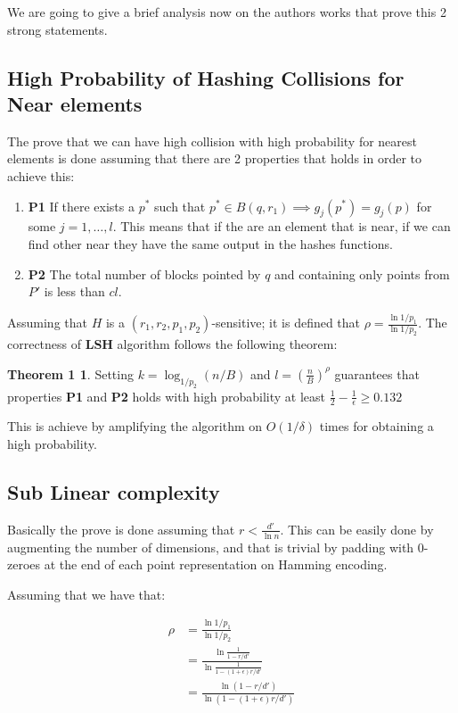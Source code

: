 \documentclass[12pt, a4paper]{article}
\theoremstyle{definition}
\begin{document}
We are going to give a brief analysis now on the authors works that prove this 2 strong statements.

\subsection{High Probability of Hashing Collisions for Near elements}
The prove that we can have high collision with high probability for nearest elements is done assuming that there are 2 properties that holds in order to achieve this:

\begin{enumerate}
 \item \textbf{P1} If there exists a $p^*$ such that $p^* \in B(q, r_1) \implies g_j(p^*) = g_j(p)$ for some $j = 1, \dots, l$. This means that if the are an element that is near, if we can find other near they have the same output in the hashes functions.
 \item \textbf{P2} The total number of blocks pointed by $q$ and containing only points from $P'$ is less than $cl$.
\end{enumerate}

Assuming that $H$ is a $(r_1, r_2, p_1, p_2)$-sensitive; it is defined that $\rho = \frac{\ln{1/p_1}}{\ln{1/p_2}}$. The correctness of \textbf{LSH} algorithm follows the following theorem:

\newtheorem{high}{Theorem 1}
\begin{high}
  Setting $k = \log_{1/p_2}(n/B)$ and $l = (\frac{n}{B})^\rho$ guarantees that properties \textbf{P1} and \textbf{P2} holds with high probability at least $\frac{1}{2} - \frac{1}{\epsilon} \geq 0.132$
\end{high}

This is achieve by amplifying the algorithm on $O(1/\delta)$ times for obtaining a high probability.

\subsection{Sub Linear complexity}
Basically the prove is done assuming that $r < \frac{d'}{\ln{n}}$. This can be easily done by augmenting the number of dimensions, and that is trivial by padding with $0$-zeroes at the end of each point representation on Hamming encoding.

Assuming that we have that:

\begin{subequations}
  \begin{align}
  \rho &= \frac{\ln{1/p_1}}{\ln{1/p_2}} \\
       &= \frac{\ln{\frac{1}{1-r/{d'}}}}{\ln{\frac{1}{1-(1+\epsilon)r/{d'}}}} \\
       &= \frac{\ln{(1-r/{d'})}}{\ln{(1-(1+\epsilon)r/{d'})}}
  \end{align}
\end{subequations}
\end{document}
